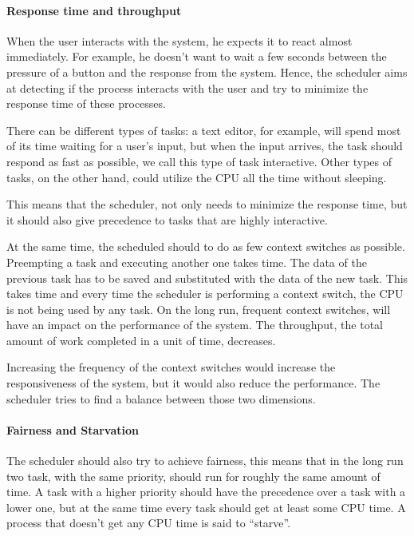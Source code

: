 \documentclass[10pt]{book}
\begin{document}
\paragraph{Response time and throughput}
When the user interacts with the system, he expects it to react almost
immediately. For example, he doesn't want to wait a few seconds
between the pressure of a button and the response from the
system. Hence, the scheduler aims at detecting if the process
interacts with the user and try to minimize the response time of these
processes.

There can be different types of tasks: a text editor, for example, will spend most of its time waiting for a user's input, but when the input arrives, the task should respond as fast as possible, we call this type of task interactive. Other types of tasks, on the other hand, could utilize the CPU all the time without sleeping.

This means that the scheduler, not only needs to minimize the response time, but it should also give precedence to tasks that are highly interactive.

At the same time, the scheduled should to do as few context switches as possible. Preempting a task and executing another one takes time. The data of the previous task has to be saved and substituted with the data of the new task. This takes time and every time the scheduler is performing a context switch, the CPU is not being used by any task. On the long run, frequent context switches, will have an impact on the performance of the system. The throughput, the total amount of work completed in a unit of time, decreases. 

Increasing the frequency of the context switches would increase the responsiveness of the system, but it would also reduce the performance. The scheduler tries to find a balance between those two dimensions.

\paragraph{Fairness and Starvation}
The scheduler should also try to achieve fairness, this means that in the long run two task, with the same priority, should run for roughly the same amount of time. A task with a higher priority should have the precedence over a task with a lower one, but at the same time every task should get at least some CPU time. A process that doesn't get any CPU time is said to ``starve''.
\end{document}

